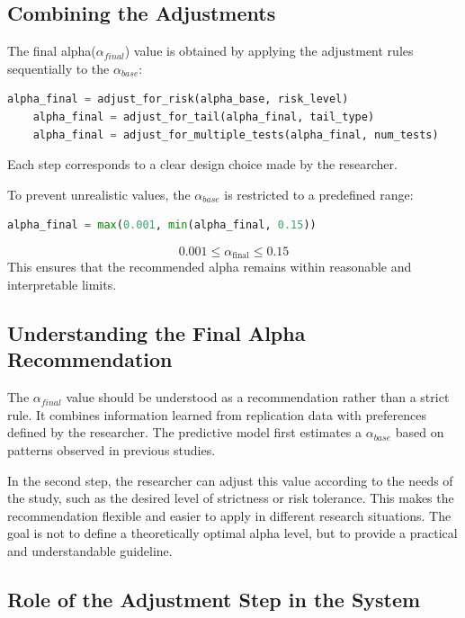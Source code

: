 {\subsection{Combining the Adjustments}

The final alpha($\alpha_{final}$) value is obtained by applying the adjustment rules sequentially to the $\alpha_{base}$:

\begin{lstlisting}[language=Python]
	alpha_final = adjust_for_risk(alpha_base, risk_level)
	alpha_final = adjust_for_tail(alpha_final, tail_type)
	alpha_final = adjust_for_multiple_tests(alpha_final, num_tests)
\end{lstlisting}

Each step corresponds to a clear design choice made by the researcher.

To prevent unrealistic values, the $\alpha_{base}$ is restricted to a predefined range:

\begin{lstlisting}[language=Python]
	alpha_final = max(0.001, min(alpha_final, 0.15))
\end{lstlisting}
\begin{equation}
	0.001 \leq \alpha_{\text{final}} \leq 0.15
\end{equation}
This ensures that the recommended alpha remains within reasonable and interpretable limits.

\subsection{Understanding the Final Alpha Recommendation}

The $\alpha_{final}$ value should be understood as a recommendation rather than a strict rule. It combines information learned from replication data with preferences defined by the researcher. The predictive model first estimates a $\alpha_{base}$ based on patterns observed in previous studies.

In the second step, the researcher can adjust this value according to the needs of the study, such as the desired level of strictness or risk tolerance. This makes the recommendation flexible and easier to apply in different research situations. The goal is not to define a theoretically optimal alpha level, but to provide a practical and understandable guideline.

\subsection{Role of the Adjustment Step in the System}

}
